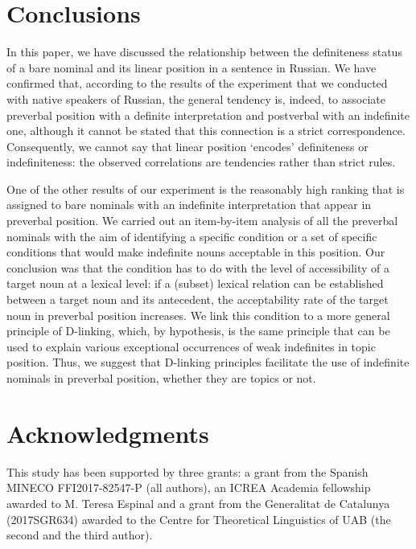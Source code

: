 \documentclass[output=paper]{langsci/langscibook}
\begin{document}
\section{Conclusions}\label{2sec:5}
In this paper, we have discussed the relationship between the definiteness status of a bare nominal and its linear position in a sentence in Russian. We have confirmed that, according to the results of the experiment that we conducted with native speakers of Russian, the general tendency is, indeed, to associate preverbal position with a definite interpretation and postverbal with an indefinite one, although it cannot be stated that this connection is a strict correspondence. Consequently, we cannot say that linear position `encodes' definiteness or indefiniteness:  the observed correlations are tendencies rather than strict rules. 

One of the other results of our experiment is the reasonably high ranking that is assigned to bare nominals with an indefinite interpretation that appear in preverbal position. We carried out an item-by-item analysis of all the preverbal nominals with the aim of identifying a specific condition or a set of specific conditions that would make indefinite nouns acceptable in this position. Our conclusion was that the condition has to do with the level of accessibility of a target noun at a lexical level: if a (subset) lexical relation can be established between a target noun and its antecedent, the acceptability rate of the target noun in preverbal position increases. We link this condition to a more general principle of D-linking, which, by hypothesis, is the same principle that can be used to explain various exceptional occurrences of weak indefinites in topic position. Thus, we suggest that D-linking principles facilitate the use of indefinite nominals in preverbal position, whether they are topics or not.


\section*{Acknowledgments}
{
This study has been supported by three grants: a grant from the Spanish MINECO FFI2017-82547-P (all authors), an ICREA Academia fellowship awarded to M. Teresa Espinal and a grant from the Generalitat de Catalunya (2017SGR634) awarded to the Centre for Theoretical Linguistics of UAB (the second and the third author).
}


{\sloppy\printbibliography[heading=subbibliography,notkeyword=this]}
\end{document}
